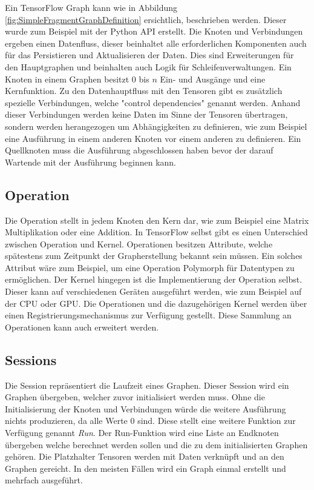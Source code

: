 Ein TensorFlow Graph kann wie in Abbildung \ref{fig:SimpleFragmentGraphDefinition} ersichtlich, beschrieben werden.
Dieser wurde zum Beispiel mit der Python API erstellt.
Die Knoten und Verbindungen ergeben einen Datenfluss, dieser beinhaltet alle erforderlichen Komponenten auch für das Persistieren und Aktualisieren der Daten.
Dies sind Erweiterungen für den Hauptgraphen und beinhalten auch Logik für Schleifenverwaltungen.
Ein Knoten in einem Graphen besitzt $0$ bis $n$ Ein- und Ausgänge und eine Kernfunktion. 
Zu den Datenhauptfluss mit den Tensoren gibt es zusätzlich spezielle Verbindungen, welche "control dependencies"  genannt werden. 
Anhand dieser Verbindungen werden keine Daten im Sinne der Tensoren übertragen, sondern werden herangezogen um Abhängigkeiten zu definieren, wie zum Beispiel eine Ausführung in einem anderen Knoten vor einem anderen zu definieren.
Ein Quellknoten muss die Ausführung abgeschlossen haben bevor der darauf Wartende  mit der Ausführung beginnen kann. \cite{wp2015tensorflow}

\subsection{Operation}

Die Operation stellt in jedem Knoten den Kern dar, wie zum Beispiel eine Matrix Multiplikation oder eine Addition.
In TensorFlow selbst gibt es einen Unterschied zwischen Operation und Kernel.
Operationen besitzen Attribute, welche spätestens zum Zeitpunkt der Grapherstellung bekannt sein müssen. 
Ein solches Attribut wäre zum Beispiel, um eine Operation Polymorph für Datentypen zu ermöglichen.  
Der Kernel hingegen ist die Implementierung der Operation selbst. 
Dieser kann auf verschiedenen Geräten ausgeführt werden, wie zum Beispiel auf der CPU oder GPU.
Die Operationen und die dazugehörigen Kernel werden über einen Registrierungsmechanismus zur Verfügung gestellt. 
Diese Sammlung an Operationen kann auch erweitert werden. \cite{wp2015tensorflow} 

\subsection{Sessions}

Die Session repräsentiert die Laufzeit eines Graphen. 
Dieser Session wird ein Graphen übergeben, welcher zuvor initialisiert werden muss. 
Ohne die Initialisierung der Knoten und Verbindungen würde die weitere Ausführung nichts produzieren, da alle Werte $0$ sind. 
Diese stellt eine weitere Funktion zur Verfügung genannt \textit{Run}. 
Der Run-Funktion wird eine Liste an Endknoten übergeben welche berechnet werden sollen und die zu dem initialisierten Graphen gehören. 
Die Platzhalter Tensoren werden mit Daten verknüpft und an den Graphen gereicht. 
In den meisten Fällen wird ein Graph einmal erstellt und mehrfach ausgeführt. \cite{wp2015tensorflow} 

